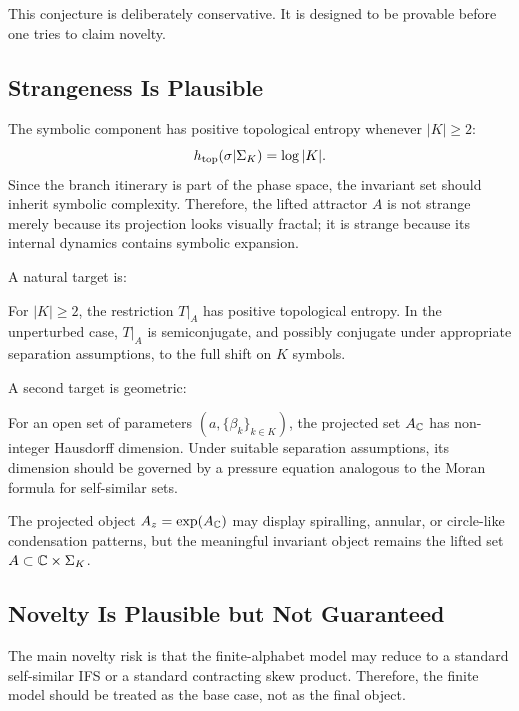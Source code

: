 	This conjecture is deliberately conservative. It is designed to be provable before one tries to claim novelty.
	
	\subsection{Strangeness Is Plausible}
	
	The symbolic component has positive topological entropy whenever \(|K|\geq 2\):
	\[
	h_{\mathrm{top}}(\sigma|\Sigma_K)=\log |K|.
	\]
	Since the branch itinerary is part of the phase space, the invariant set should inherit symbolic complexity. Therefore, the lifted attractor \(A\) is not strange merely because its projection looks visually fractal; it is strange because its internal dynamics contains symbolic expansion.
	
	A natural target is:
	
	\begin{conjecture}
		For \(|K|\geq 2\), the restriction \(T|_A\) has positive topological entropy. In the unperturbed case, \(T|_A\) is semiconjugate, and possibly conjugate under appropriate separation assumptions, to the full shift on \(K\) symbols.
	\end{conjecture}
	
	A second target is geometric:
	
	\begin{conjecture}
		For an open set of parameters \((a,\{\beta_k\}_{k\in K})\), the projected set \(A_{\mathbb{C}}\) has non-integer Hausdorff dimension. Under suitable separation assumptions, its dimension should be governed by a pressure equation analogous to the Moran formula for self-similar sets.
	\end{conjecture}
	
	The projected object \(A_z=\exp(A_{\mathbb{C}})\) may display spiralling, annular, or circle-like condensation patterns, but the meaningful invariant object remains the lifted set \(A\subset \mathbb{C}\times\Sigma_K\).
	
	\subsection{Novelty Is Plausible but Not Guaranteed}
	
	The main novelty risk is that the finite-alphabet model may reduce to a standard self-similar IFS or a standard contracting skew product. Therefore, the finite model should be treated as the base case, not as the final object.
	
